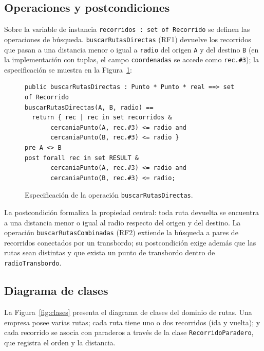 \subsection{Operaciones y postcondiciones}
\label{sec:operaciones}

Sobre la variable de instancia \texttt{recorridos : set of Recorrido} se
definen las operaciones de búsqueda. \texttt{buscarRutasDirectas} (RF1)
devuelve los recorridos que pasan a una distancia menor o igual a
\texttt{radio} del origen \texttt{A} y del destino \texttt{B} (en la
implementación con tuplas, el campo \texttt{coordenadas} se accede como
\texttt{rec.\#3}); la especificación se muestra en la
Figura~\ref{fig:codigo-directas}:

\begin{figure}[!t]
\centering
\begin{lstlisting}
public buscarRutasDirectas : Punto * Punto * real ==> set of Recorrido
buscarRutasDirectas(A, B, radio) ==
  return { rec | rec in set recorridos &
       cercaniaPunto(A, rec.#3) <= radio and
       cercaniaPunto(B, rec.#3) <= radio }
pre A <> B
post forall rec in set RESULT &
       cercaniaPunto(A, rec.#3) <= radio and
       cercaniaPunto(B, rec.#3) <= radio;
\end{lstlisting}
\caption{Especificación de la operación \texttt{buscarRutasDirectas}.}
\label{fig:codigo-directas}
\end{figure}

La postcondición formaliza la propiedad central: toda ruta devuelta se
encuentra a una distancia menor o igual al radio respecto del origen y
del destino. La operación \texttt{buscarRutasCombinadas} (RF2) extiende
la búsqueda a pares de recorridos conectados por un transbordo; su
postcondición exige además que las rutas sean distintas y que exista un
punto de transbordo dentro de \texttt{radioTransbordo}.

\subsection{Diagrama de clases}
\label{sec:clases}

La Figura~\ref{fig:clases} presenta el diagrama de clases del dominio de
rutas. Una empresa posee varias rutas; cada ruta tiene uno o dos
recorridos (ida y vuelta); y cada recorrido se asocia con paraderos a
través de la clase \texttt{RecorridoParadero}, que registra el orden y la
distancia.

